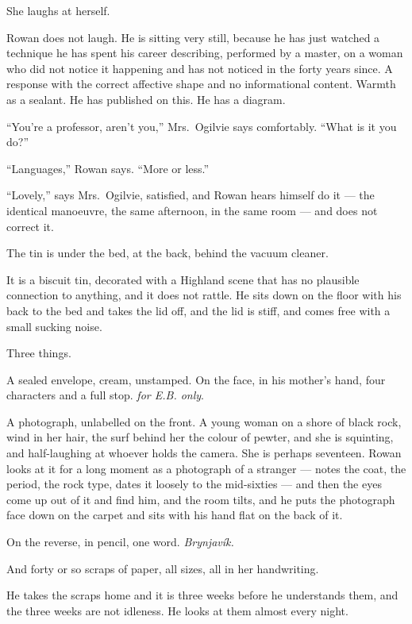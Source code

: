 \documentclass[11pt,oneside]{book}
\newcommand{\sceneline}{%
  \par\vspace{1.2em}
  \begin{center}
    \fontsize{11}{11}\selectfont \textbullet\quad\textbullet\quad\textbullet
  \end{center}
  \vspace{0.6em}\noindent\ignorespaces
}
\begin{document}
She laughs at herself.

Rowan does not laugh. He is sitting very still, because he has just
watched a technique he has spent his career describing, performed by a
master, on a woman who did not notice it happening and has not noticed
in the forty years since. A response with the correct affective shape
and no informational content. Warmth as a sealant. He has published on
this. He has a diagram.

``You're a professor, aren't you,'' Mrs.~Ogilvie says comfortably.
``What is it you do?''

``Languages,'' Rowan says. ``More or less.''

``Lovely,'' says Mrs.~Ogilvie, satisfied, and Rowan hears himself do it
--- the identical manoeuvre, the same afternoon, in the same room ---
and does not correct it.

\sceneline

The tin is under the bed, at the back, behind the vacuum cleaner.

It is a biscuit tin, decorated with a Highland scene that has no
plausible connection to anything, and it does not rattle. He sits down
on the floor with his back to the bed and takes the lid off, and the lid
is stiff, and comes free with a small sucking noise.

Three things.

A sealed envelope, cream, unstamped. On the face, in his mother's hand,
four characters and a full stop. \emph{for E.B. only}.

A photograph, unlabelled on the front. A young woman on a shore of black
rock, wind in her hair, the surf behind her the colour of pewter, and
she is squinting, and half-laughing at whoever holds the camera. She is
perhaps seventeen. Rowan looks at it for a long moment as a photograph
of a stranger --- notes the coat, the period, the rock type, dates it
loosely to the mid-sixties --- and then the eyes come up out of it and
find him, and the room tilts, and he puts the photograph face down on
the carpet and sits with his hand flat on the back of it.

On the reverse, in pencil, one word. \emph{Brynjavík.}

And forty or so scraps of paper, all sizes, all in her handwriting.

\sceneline

He takes the scraps home and it is three weeks before he understands
them, and the three weeks are not idleness. He looks at them almost
every night.
\end{document}

